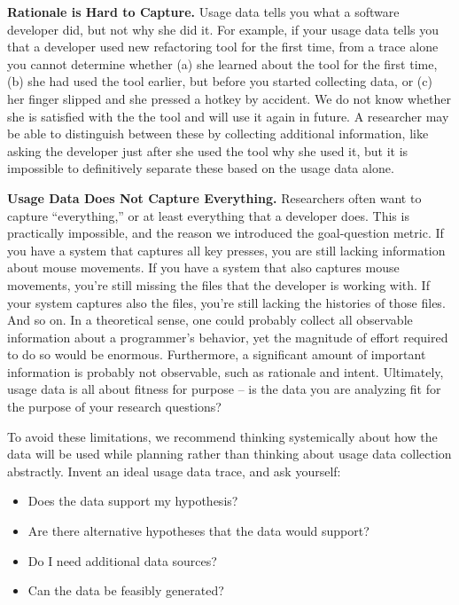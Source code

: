 \documentclass{book}
\begin{document}
\textbf{Rationale is Hard to Capture.}
Usage data tells you what a software developer did, but not
why she did it.
For example, if your usage data tells you that a developer used
new refactoring tool for the first time, from a trace alone you cannot determine whether
(a) she learned about the tool for the first time, (b) she had used the tool earlier, but before you started collecting data, or (c) her finger slipped and she pressed a hotkey by accident. We do not know whether she is satisfied with the the tool and will use it again in future.
A researcher may be able to distinguish between these by collecting additional information,
like asking the developer just after she used the tool why she used it,
but it is impossible to definitively separate these based on the
usage data alone.

\textbf{Usage Data Does Not Capture Everything.}
Researchers often want to capture ``everything,'' or at least
everything that a developer does.
This is practically impossible, and the reason we introduced the
goal-question metric.
If you have a system that captures all key presses, you are still
lacking information about mouse movements.
If you have a system that also captures mouse movements, you're still
missing the files that the developer is working with.
If your system captures also the files, you're still lacking the
histories of those files.
And so on.
In a theoretical sense, one could probably collect all observable information
about a programmer's behavior, yet the magnitude of effort required to 
do so would be enormous.
Furthermore, a significant amount of important information is probably not observable,
such as rationale and intent.
Ultimately, usage data is all about fitness for purpose -- is the data
you are analyzing fit for the purpose of your research questions?

To avoid these limitations, we recommend thinking systemically about how the data will be used while planning rather than thinking about usage data collection abstractly.
Invent an ideal usage data trace, and ask yourself:

\begin{itemize}[noitemsep]
  \item Does the data support my hypothesis?
  \item Are there alternative hypotheses that the data would support?
  \item Do I need additional data sources?
  \item Can the data be feasibly generated?
\end{itemize}
\end{document}
